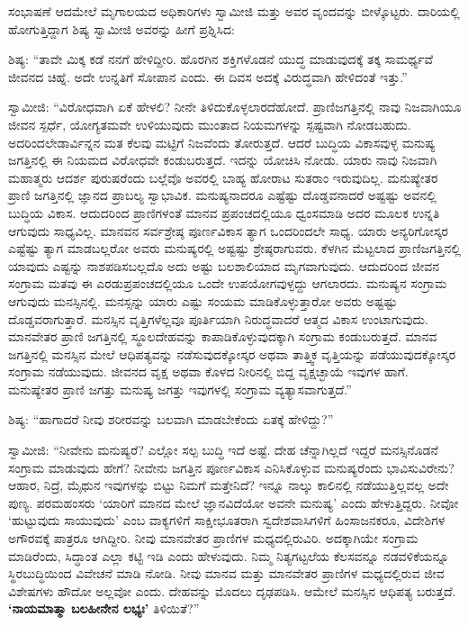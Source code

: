  ಸಂಭಾಷಣೆ ಆದಮೇಲೆ ಮೃಗಾಲಯದ ಅಧಿಕಾರಿಗಳು ಸ್ವಾಮೀಜಿ ಮತ್ತು ಅವರ ವೃಂದವನ್ನು ಬೀಳ್ಕೊಟ್ಟರು. ದಾರಿಯಲ್ಲಿ ಹೋಗುತ್ತಿದ್ದಾಗ ಶಿಷ್ಯ ಸ್ವಾಮೀಜಿ ಅವರನ್ನು ಹೀಗೆ ಪ್ರಶ್ನಿಸಿದ: 

 ಶಿಷ್ಯ: “ತಾವೇ ಮಿಕ್ಕ ಕಡೆ ನನಗೆ ಹೇಳಿದ್ದೀರಿ. ಹೊರಗಿನ ಶಕ್ತಿಗಳೊಡನೆ ಯುದ್ಧ ಮಾಡುವುದಕ್ಕೆ ತಕ್ಕ ಸಾಮರ್ಥ್ಯವೆ ಜೀವನದ ಚಿಹ್ನೆ. ಅದೇ ಉನ್ನತಿಗೆ ಸೋಪಾನ ಎಂದು. ಈ ದಿವಸ ಅದಕ್ಕೆ ವಿರುದ್ಧವಾಗಿ ಹೇಳಿದಂತೆ ಇತ್ತು.” 

 ಸ್ವಾಮೀಜಿ: “ವಿರೋಧವಾಗಿ ಏಕೆ ಹೇಳಲಿ? ನೀನೇ ತಿಳಿದುಕೊಳ್ಳಲಾರದೆಹೋದೆ. ಪ್ರಾಣಿಜಗತ್ತಿನಲ್ಲಿ ನಾವು ನಿಜವಾಗಿಯೂ ಜೀವನ ಸ್ಪರ್ಧೆ, ಯೋಗ್ಯತಮವೇ ಉಳಿಯುವುದು ಮುಂತಾದ ನಿಯಮಗಳನ್ನು ಸ್ಪಷ್ಟವಾಗಿ ನೋಡಬಹುದು. ಅದರಿಂದಲೇ\break ಡಾರ್ವಿನ್ನನ ಮತ ಕೆಲವು ಮಟ್ಟಿಗೆ ನಿಜವೆಂದು ತೋರುತ್ತದೆ. ಆದರೆ ಬುದ್ಧಿಯ ವಿಕಾಸವುಳ್ಳ ಮನುಷ್ಯ ಜಗತ್ತಿನಲ್ಲಿ ಈ ನಿಯಮದ ವಿರೋಧವೇ ಕಂಡುಬರುತ್ತದೆ. ಇದನ್ನು ಯೋಚಿಸಿ ನೋಡು. ಯಾರು ನಾವು ನಿಜವಾಗಿ ಮಹಾತ್ಮರು ಆದರ್ಶ ಪುರುಷರೆಂದು ಬಲ್ಲೆವೊ ಅವರಲ್ಲಿ ಬಾಹ್ಯ ಹೋರಾಟ ಸುತರಾಂ ಇರುವುದಿಲ್ಲ. ಮನುಷ್ಯೇತರ ಪ್ರಾಣಿ ಜಗತ್ತಿನಲ್ಲಿ ಜ್ಞಾನದ ಪ್ರಾಬಲ್ಯ ಸ್ವಾಭಾವಿಕ. ಮನುಷ್ಯನಾದರೂ ಎಷ್ಟೆಷ್ಟು ದೊಡ್ಡವನಾದರೆ ಅಷ್ಟಷ್ಟು ಅವನಲ್ಲಿ ಬುದ್ಧಿಯ ವಿಕಾಸ. ಆದುದರಿಂದ ಪ್ರಾಣಿಗಳಂತೆ ಮಾನವ ಪ್ರಪಂಚದಲ್ಲಿಯೂ ಧ್ವಂಸಮಾಡಿ ಅದರ ಮೂಲಕ ಉನ್ನತಿ ಆಗುವುದು ಸಾಧ್ಯವಿಲ್ಲ. ಮಾನವನ ಸರ್ವಶ್ರೇಷ್ಠ ಪೂರ್ಣವಿಕಾಸ ತ್ಯಾಗ ಒಂದರಿಂದಲೇ ಸಾಧ್ಯ. ಯಾರು ಅನ್ಯರಿಗೋಸ್ಕರ ಎಷ್ಟೆಷ್ಟು ತ್ಯಾಗ ಮಾಡಬಲ್ಲರೋ ಅವರು ಮನುಷ್ಯರಲ್ಲಿ ಅಷ್ಟಷ್ಟು ಶ್ರೇಷ್ಠರಾಗುವರು. ಕೆಳಗಿನ ಮೆಟ್ಟಲಾದ ಪ್ರಾಣಿಜಗತ್ತಿನಲ್ಲಿ ಯಾವುದು ಎಷ್ಟನ್ನು ನಾಶಪಡಿಸಬಲ್ಲದೊ ಅದು ಅಷ್ಟು ಬಲಶಾಲಿಯಾದ ಮೃಗವಾಗುವುದು. ಆದುದರಿಂದ ಜೀವನ ಸಂಗ್ರಾಮ ಮತವು ಈ ಎರಡು\break ಪ್ರಪಂಚದಲ್ಲಿಯೂ ಒಂದೇ ಉಪಯೋಗವುಳ್ಳದ್ದು ಆಗಲಾರದು. ಮನುಷ್ಯನ ಸಂಗ್ರಾಮ ಆಗುವುದು ಮನಸ್ಸಿನಲ್ಲಿ. ಮನಸ್ಸನ್ನು ಯಾರು ಎಷ್ಟು ಸಂಯಮ ಮಾಡಿಕೊಳ್ಳುತ್ತಾರೋ ಅವರು ಅಷ್ಟಷ್ಟು ದೊಡ್ಡವರಾಗುತ್ತಾರೆ. ಮನಸ್ಸಿನ ವೃತ್ತಿಗಳೆಲ್ಲವೂ ಪೂರ್ತಿಯಾಗಿ ನಿರುದ್ಧವಾದರೆ ಆತ್ಮದ ವಿಕಾಸ ಉಂಟಾಗುವುದು. ಮಾನವೇತರ ಪ್ರಾಣಿ ಜಗತ್ತಿನಲ್ಲಿ ಸ್ಥೂಲದೇಹವನ್ನು ಕಾಪಾಡಿಕೊಳ್ಳುವುದಕ್ಕಾಗಿ ಸಂಗ್ರಾಮ ಕಂಡುಬರುತ್ತದೆ. ಮಾನವ ಜಗತ್ತಿನಲ್ಲಿ ಮನಸ್ಸಿನ ಮೇಲೆ ಆಧಿಪತ್ಯವನ್ನು ನಡೆಸುವುದಕ್ಕೋಸ್ಕರ ಅಥವಾ ತಾತ್ತ್ವಿಕ ವೃತ್ತಿಯನ್ನು ಪಡೆಯುವುದಕ್ಕೋಸ್ಕರ ಸಂಗ್ರಾಮ ನಡೆಯುವುದು. ಜೀವನದ ವೃಕ್ಷ ಅಥವಾ ಕೊಳದ ನೀರಿನಲ್ಲಿ ಬಿದ್ದ ವೃಕ್ಷಚ್ಛಾಯೆ ಇವುಗಳ ಹಾಗೆ. ಮನುಷ್ಯೇತರ ಪ್ರಾಣಿ ಜಗತ್ತು ಮನುಷ್ಯ ಜಗತ್ತು ಇವುಗಳಲ್ಲಿ ಸಂಗ್ರಾಮ ವ್ಯತ್ಯಾಸವಾಗುತ್ತದೆ.”‌ 

\newpage

 ಶಿಷ್ಯ: “ಹಾಗಾದರೆ ನೀವು ಶರೀರವನ್ನು ಬಲವಾಗಿ ಮಾಡಬೇಕೆಂದು ಏತಕ್ಕೆ ಹೇಳಿದ್ದು?” 

 ಸ್ವಾಮೀಜಿ: “ನೀವೇನು ಮನುಷ್ಯರೆ? ಎಲ್ಲೋ ಸಲ್ಪ ಬುದ್ಧಿ ಇದೆ ಅಷ್ಟೆ. ದೇಹ ಚೆನ್ನಾಗಿಲ್ಲದೆ ಇದ್ದರೆ ಮನಸ್ಸಿನೊಡನೆ ಸಂಗ್ರಾಮ ಮಾಡುವುದು ಹೇಗೆ? ನೀವೇನು ಜಗತ್ತಿನ ಪೂರ್ಣವಿಕಾಸ ಎನಿಸಿಕೊಳ್ಳುವ ಮನುಷ್ಯರೆಂದು ಭಾವಿಸುವಿರೇನು? ಆಹಾರ, ನಿದ್ರೆ, ಮೈಥುನ ಇವುಗಳನ್ನು ಬಿಟ್ಟು ನಿಮಗೆ ಮತ್ತೇನಿದೆ? ಇನ್ನೂ ನಾಲ್ಕು ಕಾಲಿನಲ್ಲಿ ನಡೆಯುತ್ತಿಲ್ಲವಲ್ಲ ಅದೇ ಪುಣ್ಯ. ಪರಮಹಂಸರು ‘ಯಾರಿಗೆ ಮಾನದ ಮೇಲೆ ಜ್ಞಾನವಿದೆಯೋ ಅವನೇ ಮನುಷ್ಯ’ ಎಂದು ಹೇಳುತ್ತಿದ್ದರು. ನೀವೋ ‘ಹುಟ್ಟುವುದು ಸಾಯುವುದು’ ಎಂಬ ವಾಕ್ಯಗಳಿಗೆ ಸಾಕ್ಷೀಭೂತರಾಗಿ ಸ್ವದೇಶವಾಸಿಗಳಿಗೆ ಹಿಂಸಾಜನಕರೂ, ವಿದೇಶಿಗಳ ಅಗೌರವಕ್ಕೆ ಪಾತ್ರರೂ ಆಗಿದ್ದೀರಿ. ನೀವು ಮಾನವೇತರ ಪ್ರಾಣಿಗಳ ಮಧ್ಯದಲ್ಲಿರುವಿರಿ. ಅದಕ್ಕಾಗಿಯೇ ಸಂಗ್ರಾಮ ಮಾಡಿರೆಂದು, ಸಿದ್ಧಾಂತ ಎಲ್ಲಾ ಕಟ್ಟಿ ಇಡಿ ಎಂದು ಹೇಳುವುದು. ನಿಮ್ಮ ನಿತ್ಯಗಟ್ಟಲೆಯ ಕೆಲಸವನ್ನೂ ನಡವಳಿಕೆಯನ್ನೂ ಸ್ಥಿರಬುದ್ಧಿಯಿಂದ ವಿವೇಚನೆ ಮಾಡಿ ನೋಡಿ. ನೀವು ಮಾನವ ಮತ್ತು ಮಾನವೇತರ ಪ್ರಾಣಿಗಳ ಮಧ್ಯದಲ್ಲಿರುವ ಜೀವ ವಿಶೇಷಗಳು ಹೌದೋ ಅಲ್ಲವೋ ಎಂದು. ದೇಹವನ್ನು ಮೊದಲು ದೃಢಪಡಿಸಿ. ಆಮೇಲೆ ಮನಸ್ಸಿನ ಆಧಿಪತ್ಯ ಬರುತ್ತದೆ. \textbf{‘ನಾಯಮಾತ್ಮಾ ಬಲಹೀನೇನ ಲಭ್ಯಃ’} ತಿಳಿಯಿತೆ?” 

